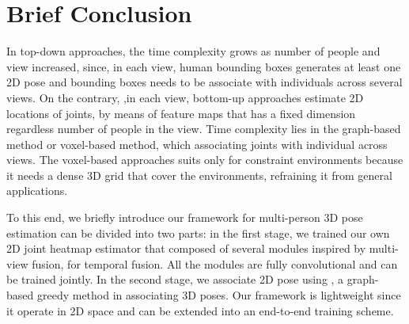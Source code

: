 \section{Brief Conclusion}
In top-down approaches, the time complexity grows as number of people and view increased, since, in each view, human bounding boxes generates at least one 2D pose and bounding boxes needs to be associate with individuals across several views. On the contrary, ,in each view, bottom-up approaches estimate 2D locations of joints, by means of feature maps that has a fixed dimension regardless number of people in the view. Time complexity lies in the graph-based method or voxel-based method, which associating joints with individual across views. The voxel-based approaches suits only for constraint environments because it needs a dense 3D grid that cover the environments, refraining it from general applications. 
 
To this end, we briefly introduce our framework for multi-person 3D pose estimation can be divided into two parts: in the first stage, we trained our own 2D joint heatmap estimator that composed of several modules inspired by \cite{epipolartransformers, multiviewpose} multi-view fusion,  \cite{pavllo:videopose3d:2019} for temporal fusion. All the modules are fully convolutional and can be trained jointly. In the second stage, we associate 2D pose using \cite{tanke2019iterative}, a graph-based greedy method in associating 3D poses. Our framework is lightweight since it operate in 2D space and can be extended into an end-to-end training scheme.